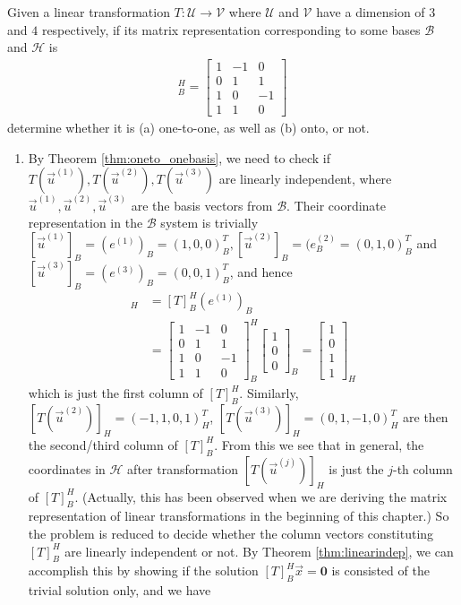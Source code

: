 \begin{exmp}
Given a linear transformation $T: \mathcal{U} \to \mathcal{V}$ where $\mathcal{U}$ and $\mathcal{V}$ have a dimension of $3$ and $4$ respectively, if its matrix representation corresponding to some bases $\mathcal{B}$ and $\mathcal{H}$ is
\begin{align*}
[T]_B^H =
\begin{bmatrix}
1 & -1 & 0 \\
0 & 1 & 1 \\
1 & 0 & -1 \\
1 & 1 & 0
\end{bmatrix}
\end{align*}
determine whether it is (a) one-to-one, as well as (b) onto, or not.
\end{exmp}
\begin{solution}
\begin{enumerate}[label=(\alph*)]
    \item By Theorem \ref{thm:oneto_onebasis}, we need to check if $T(\vec{u}^{(1)}), T(\vec{u}^{(2)}), T(\vec{u}^{(3)})$ are linearly independent, where $\vec{u}^{(1)}, \vec{u}^{(2)}, \vec{u}^{(3)}$ are the basis vectors from $\mathcal{B}$. Their coordinate representation in the $\mathcal{B}$ system is trivially $[\vec{u}^{(1)}]_B = (e^{(1)})_B = (1,0,0)_B^T, [\vec{u}^{(2)}]_B = (e^{(2)}_B = (0,1,0)_B^T$ and $[\vec{u}^{(3)}]_B = (e^{(3)})_B = (0,0,1)_B^T$, and hence
    \begin{align*}
    [T(\vec{u}^{(1)})]_H &= [T]_B^H(e^{(1)})_B \\
    &= 
    \begin{bmatrix}
    1 & -1 & 0 \\
    0 & 1 & 1 \\
    1 & 0 & -1 \\
    1 & 1 & 0
    \end{bmatrix}_B^H
    \begin{bmatrix}
    1 \\
    0 \\
    0
    \end{bmatrix}_B = 
    \begin{bmatrix}
    1 \\
    0 \\
    1 \\
    1
    \end{bmatrix}_H
    \end{align*}
    which is just the first column of $[T]_B^H$. Similarly, $[T(\vec{u}^{(2)})]_H = (-1,1,0,1)_H^T$, $[T(\vec{u}^{(3)})]_H = (0,1,-1,0)_H^T$ are then the second/third column of $[T]_B^H$. From this we see that in general, the coordinates in $\mathcal{H}$ after transformation $[T(\vec{u}^{(j)})]_H$ is just the $j$-th column of $[T]_B^H$. (Actually, this has been observed when we are deriving the matrix representation of linear transformations in the beginning of this chapter.) So the problem is reduced to decide whether the column vectors constituting $[T]_B^H$ are linearly independent or not. By Theorem \ref{thm:linearindep}, we can accomplish this by showing if the solution $[T]_B^H\vec{x} = \textbf{0}$ is consisted of the trivial solution only, and we have

\end{enumerate}
\end{solution}
